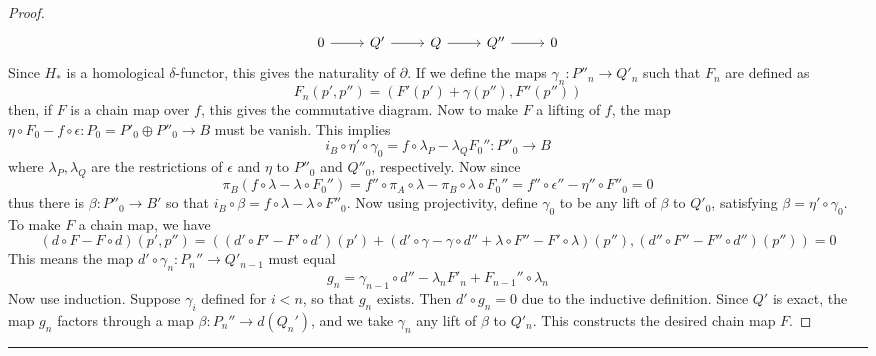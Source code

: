 \begin{proof}
\begin{equation}
\begin{tikzcd}
0\arrow{r}&Q'\arrow{r}&Q\arrow{r}&Q''\arrow{r}&0
\end{tikzcd}
\end{equation}
Since $H_*$ is a homological $\delta$-functor, this gives the naturality of $\partial$. If we define the maps $\gamma_n:P''_n\rightarrow Q'_n$ such that $F_n$ are defined as
\begin{equation}
F_n(p',p'')=(F'(p')+\gamma(p''),F''(p''))
\end{equation}
then, if $F$ is a chain map over $f$, this gives the commutative diagram. Now to make $F$ a lifting of $f$, the map $\eta\circ F_0-f\circ \epsilon:P_0=P'_0\oplus P''_0\rightarrow B$ must be vanish. This implies
\begin{equation}
i_B\circ \eta'\circ \gamma_0=f\circ \lambda_P-\lambda_Q F_0'':P''_0\rightarrow B
\end{equation}
where $\lambda_P,\lambda_Q$ are the restrictions of $\epsilon$ and $\eta$ to $P''_0$ and $Q''_0$, respectively. Now since
\begin{equation}
\pi_B(f\circ\lambda-\lambda \circ F_0'')=f''\circ\pi_A\circ\lambda-\pi_B\circ\lambda\circ F_0''=f''\circ \epsilon''-\eta''\circ F''_0=0
\end{equation}
thus there is $\beta:P''_0\rightarrow B'$ so that $i_B \circ \beta=f\circ \lambda-\lambda\circ F''_0$. Now using projectivity, define $\gamma_0$ to be any lift of $\beta$ to $Q'_0$, satisfying $\beta=\eta'\circ \gamma_0$. To make $F$ a chain map, we have
\begin{equation}
(d\circ F-F\circ d)(p',p'')=((d'\circ F'-F'\circ d')(p')+(d'\circ\gamma-\gamma\circ d''+\lambda\circ F''-F'\circ \lambda)(p''),(d''\circ F''-F''\circ d'')(p''))=0
\end{equation}
This means the map $d'\circ \gamma_n:P_n''\rightarrow Q'_{n-1}$ must equal
\begin{equation}
g_n=\gamma_{n-1}\circ d''-\lambda_n F'_n+F_{n-1}''\circ \lambda_n
\end{equation}
Now use induction. Suppose $\gamma_i$ defined for $i<n$, so that $g_n$ exists. Then $d'\circ g_n=0$ due to the inductive definition. Since $Q'$ is exact, the map $g_n$ factors through a map $\beta:P_n''\rightarrow d(Q_n')$, and we take $\gamma_n$ any lift of $\beta$ to $Q'_n$. This constructs the desired chain map $F$.
\end{proof}
\noindent\rule{\textwidth}{1pt}
\newline